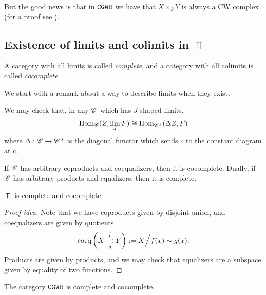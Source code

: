 \documentclass{article}[11pt]
\begin{document}
But the good news is that in $\texttt{CGWH}$ we have that $X\times_k Y$ is always a CW complex (for a proof see \cite{Hatcher}).

\subsection{Existence of limits and colimits in $\Top$}

\begin{definition} A category with all limits is called \textit{complete}, and a category with all colimits is called \textit{cocomplete}.
\end{definition}

We start with a remark about a way to describe limits when they exist. 

\begin{remark}\label{diagonallimit} We may check that, in any $\mathscr{C}$ which has $J$-shaped limits,
	\begin{align*}
		\textup{Hom}_{\mathscr{C}} (Z, \lim_J F) \cong \textup{Hom}_{\mathscr{C}^J} (\Delta  Z, F)
	\end{align*}
	where $\Delta : \mathscr{C} \to \mathscr{C}^J$ is the diagonal functor which sends $c$ to the constant diagram at $c$.
\end{remark}

\begin{proposition} If $\mathscr{C}$ has arbitrary coproducts and coequalizers, then it is cocomplete. Dually, if $\mathscr{C}$ has arbitrary products and equalizers, then it is complete.
\end{proposition}

\begin{proposition} $\Top$ is complete and cocomplete.
\end{proposition}
\begin{proof}[Proof idea] Note that we have coproducts given by disjoint union, and coequalizers are given by quotients
\begin{align*}
	\text{coeq} \left( X \overset{f}{\underset{g}{\rightrightarrows}} Y \right) := X\Big/f(x) \sim g(x).
\end{align*}
Products are given by products, and we may check that equalizers are a subspace given by equality of two functions.

\end{proof}

\begin{proposition} The category $\texttt{CGWH}$ is  complete and cocomplete.
\end{proposition}
\end{document}
